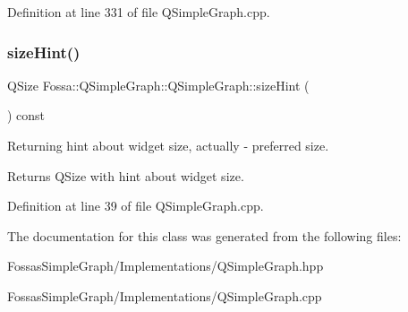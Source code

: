 Definition at line 331 of file Q\+Simple\+Graph.\+cpp.

\mbox{\label{class_fossa_1_1_q_simple_graph_1_1_q_simple_graph_a7cc7465f2137a1d9f80425afec47faeb}} 
\subsubsection{\texorpdfstring{size\+Hint()}{sizeHint()}}
{\footnotesize\ttfamily Q\+Size Fossa\+::\+Q\+Simple\+Graph\+::\+Q\+Simple\+Graph\+::size\+Hint (\begin{DoxyParamCaption}{ }\end{DoxyParamCaption}) const}



Returning hint about widget size, actually -\/ preferred size. 

\begin{DoxyReturn}{Returns}
Q\+Size with hint about widget size. 
\end{DoxyReturn}


Definition at line 39 of file Q\+Simple\+Graph.\+cpp.



The documentation for this class was generated from the following files\+:\begin{DoxyCompactItemize}
\item 
Fossas\+Simple\+Graph/\+Implementations/Q\+Simple\+Graph.\+hpp\item 
Fossas\+Simple\+Graph/\+Implementations/Q\+Simple\+Graph.\+cpp\end{DoxyCompactItemize}
